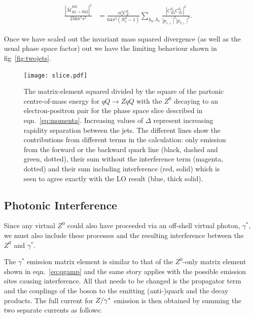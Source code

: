 		\begin{align}
		\begin{split}
			\frac{{|\bar{\mathcal{M}}_{qQ\to ZqQ}^{HE}|}^2}{256\pi^5s^2} &= \frac{\alpha_s^2C_F^2}{64\pi^3(N_c^2-1)}
			\sum_{h_a, h_e}\frac{|C_{Za}^{h_a}C_{Ze}^{h_e}|^2}{|p_{1\perp}|^2|p_{2\perp}|^2}.
			\label{eqn:zLimit}
		\end{split}
		\end{align}

		Once we have scaled out the invariant mass squared divergence (as well as the usual phase
		space factor) out we have the limiting behaviour shown in fig~\eqref{fig:twojets}.

		\begin{figure}[hbt]
		  \begin{center}
		    \texttt{[image: slice.pdf]}
		    \caption{The matrix-element squared divided by the square of the partonic
		      centre-of-mass energy for $qQ\to ZqQ$ with the $Z^0$ decaying to an
		      electron-positron pair for the phase space slice described in
		      eqn.~\eqref{eq:momenta}.  Increasing values of $\Delta$ represent
		      increasing rapidity separation between the jets.  The different lines show the contributions from
		      different terms in the calculation: only emission from the forward or the
		      backward quark line (black, dashed and green, dotted), their sum without
		      the interference term (magenta, dotted) and their sum including
		      interference (red, solid) which is seen to agree exactly with the LO result
		      (blue, thick solid).}
		    \label{fig:twojets}
		  \end{center}
		\end{figure}

	\subsection{Photonic Interference}

		Since any virtual $Z^0$ could also have proceeded via an off-shell virtual photon,
		$\gamma^*$, we must also include these processes and the resulting interference
		between the $Z^0$ and $\gamma^*$.

		The $\gamma^*$ emission matrix element is similar to that of the $Z^0$-only matrix
		element shown in eqn.~\eqref{eq:qgamp} and the same story applies with the
		possible emission sites causing interference.  All that needs to be changed is the
		propagator term and the couplings of the boson to the emitting (anti-)quark and
		the decay products.  The full current for $Z/\gamma^*$ emission is then obtained by summing
		the two separate currents as follows:

